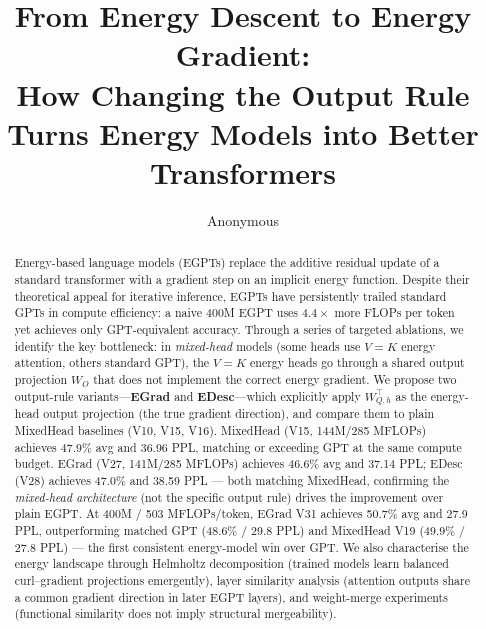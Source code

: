 \documentclass[11pt]{article}
\title{\textbf{From Energy Descent to Energy Gradient:\\
How Changing the Output Rule Turns Energy Models into Better Transformers}}
\author{Anonymous}
\date{}
\begin{document}
\maketitle

\begin{abstract}
Energy-based language models (EGPTs) replace the additive residual update of a standard
transformer with a gradient step on an implicit energy function.
Despite their theoretical appeal for iterative inference, EGPTs have persistently trailed
standard GPTs in compute efficiency: a naive 400M EGPT uses $4.4\times$ more FLOPs per
token yet achieves only GPT-equivalent accuracy.
Through a series of targeted ablations, we identify the key bottleneck: in
\emph{mixed-head} models (some heads use $V{=}K$ energy attention, others standard GPT),
the $V{=}K$ energy heads go through a shared output projection $W_O$ that does not
implement the correct energy gradient.
We propose two output-rule variants---\textbf{EGrad} and \textbf{EDesc}---which
explicitly apply $W_{Q,h}^\top$ as the energy-head output projection (the true gradient
direction), and compare them to plain MixedHead baselines (V10, V15, V16).
MixedHead (V15, 144M/285 MFLOPs) achieves 47.9\% avg and 36.96 PPL, matching or
exceeding GPT at the same compute budget.
EGrad (V27, 141M/285 MFLOPs) achieves 46.6\% avg and 37.14 PPL;
EDesc (V28) achieves 47.0\% and 38.59 PPL --- both matching MixedHead,
confirming the \emph{mixed-head architecture} (not the specific output rule)
drives the improvement over plain EGPT.
At 400M / 503 MFLOPs/token, EGrad V31 achieves 50.7\% avg and 27.9 PPL,
outperforming matched GPT (48.6\% / 29.8 PPL) and MixedHead V19 (49.9\% / 27.8 PPL) ---
the first consistent energy-model win over GPT.
We also characterise the energy landscape through Helmholtz decomposition (trained models
learn balanced curl--gradient projections emergently), layer similarity analysis
(attention outputs share a common gradient direction in later EGPT layers), and
weight-merge experiments (functional similarity does not imply structural mergeability).
\end{abstract}

\tableofcontents
\newpage











\appendix









\end{document}
